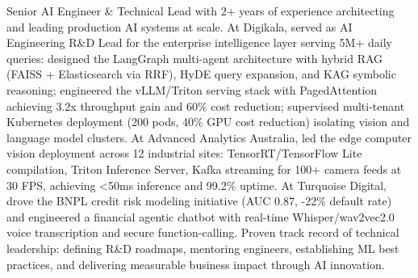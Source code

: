 \small{Senior AI Engineer \& Technical Lead with 2+ years of experience architecting and leading production AI systems at scale. At Digikala, served as AI Engineering R\&D Lead for the enterprise intelligence layer serving 5M+ daily queries: designed the LangGraph multi-agent architecture with hybrid RAG (FAISS + Elasticsearch via RRF), HyDE query expansion, and KAG symbolic reasoning; engineered the vLLM/Triton serving stack with PagedAttention achieving 3.2x throughput gain and 60\% cost reduction; supervised multi-tenant Kubernetes deployment (200 pods, 40\% GPU cost reduction) isolating vision and language model clusters. At Advanced Analytics Australia, led the edge computer vision deployment across 12 industrial sites: TensorRT/TensorFlow Lite compilation, Triton Inference Server, Kafka streaming for 100+ camera feeds at 30 FPS, achieving <50ms inference and 99.2\% uptime. At Turquoise Digital, drove the BNPL credit risk modeling initiative (AUC 0.87, -22\% default rate) and engineered a financial agentic chatbot with real-time Whisper/wav2vec2.0 voice transcription and secure function-calling. Proven track record of technical leadership: defining R\&D roadmaps, mentoring engineers, establishing ML best practices, and delivering measurable business impact through AI innovation.}\vspace{4pt}